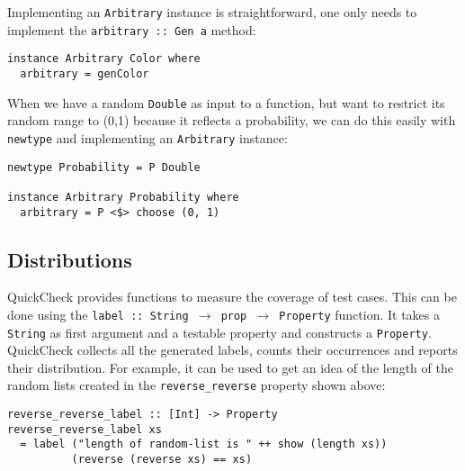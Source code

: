 Implementing an \texttt{Arbitrary} instance is straightforward, one only needs to implement the \texttt{arbitrary :: Gen a} method:

\begin{footnotesize}
\begin{verbatim}
instance Arbitrary Color where
  arbitrary = genColor
\end{verbatim}
\end{footnotesize}

When we have a random \texttt{Double} as input to a function, but want to restrict its random range to (0,1) because it reflects a probability, we can do this easily with \texttt{newtype} and implementing an \texttt{Arbitrary} instance:

\begin{footnotesize}
\begin{verbatim}
newtype Probability = P Double

instance Arbitrary Probability where
  arbitrary = P <$> choose (0, 1)
\end{verbatim}
\end{footnotesize}

\subsection{Distributions}
QuickCheck provides functions to measure the coverage of test cases. This can be done using the 
\texttt{label :: String $\rightarrow$ prop $\rightarrow$ Property} function. It takes a \texttt{String} as first argument and a testable property and constructs a \texttt{Property}. QuickCheck collects all the generated labels, counts their occurrences and reports their distribution. For example, it can be used to get an idea of the length of the random lists created in the \texttt{reverse\_reverse} property shown above:

\begin{footnotesize}
\begin{verbatim}
reverse_reverse_label :: [Int] -> Property
reverse_reverse_label xs  
  = label ("length of random-list is " ++ show (length xs)) 
          (reverse (reverse xs) == xs)
\end{verbatim}
\end{footnotesize}

